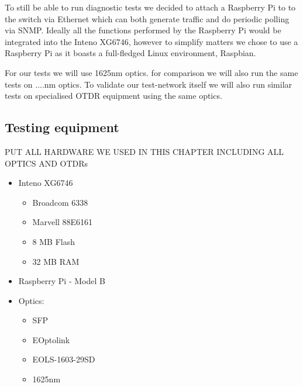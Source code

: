 \documentclass{article}
\begin{document}
To still be able to run diagnostic tests we decided to attach a Raspberry Pi to to the switch via Ethernet which can both generate traffic and do periodic polling via SNMP.
Ideally all the functions performed by the Raspberry Pi would be integrated into the Inteno XG6746, however to simplify matters we chose to use a Raspberry Pi as it boasts a full-fledged Linux environment, Raspbian\cite{raspbian:raspbian}.

For our tests we will use 1625nm optics. for comparison we will also run the same tests on ....nm optics. To validate our test-network itself we will also run similar tests on specialised OTDR equipment using the same optics.

\subsection{Testing equipment}

PUT ALL HARDWARE WE USED IN THIS CHAPTER INCLUDING ALL OPTICS AND OTDRs
\begin{itemize}
\item Inteno XG6746 \cite{Inteno:XG6746}
\begin{itemize}
\item Broadcom 6338
\item Marvell 88E6161
\item 8 MB Flash
\item 32 MB RAM
\end{itemize}

\item Raspberry Pi - Model B

\item Optics:
\begin{itemize}
\item SFP
\item EOptolink
\item EOLS-1603-29SD
\item 1625nm
\end{itemize}
\end{itemize}
\end{document}
